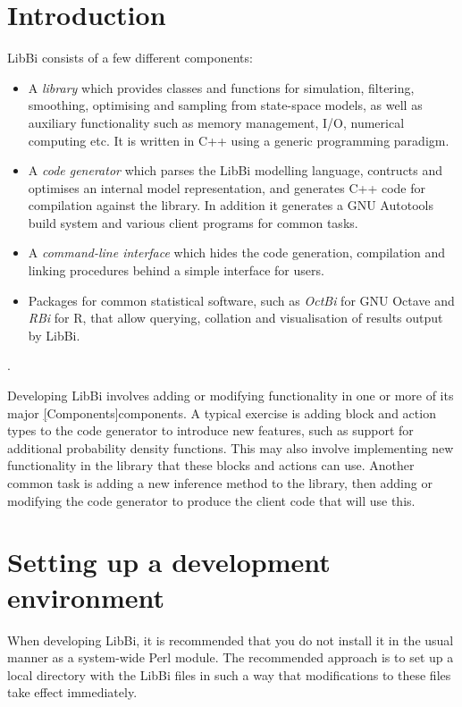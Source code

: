 \section{Introduction}

LibBi consists of a few different components:
\begin{itemize}
\item A \emph{library} which provides classes and functions for simulation,
  filtering, smoothing, optimising and sampling from state-space models, as
  well as auxiliary functionality such as memory management, I/O, numerical
  computing etc. It is written in C++ using a generic programming paradigm.
\item A \emph{code generator} which parses the LibBi modelling language,
  contructs and optimises an internal model representation, and generates C++
  code for compilation against the library. In addition it generates a GNU
  Autotools build system and various client programs for common tasks.
\item A \emph{command-line interface} which hides the code generation,
  compilation and linking procedures behind a simple interface for users.
\item Packages for common statistical software, such as \emph{OctBi} for GNU
  Octave and \emph{RBi} for R, that allow querying, collation and
  visualisation of results output by LibBi.
\end{itemize}.

Developing LibBi involves adding or modifying functionality in one or more of
its major \hyperref[hyper][Components]{components}. A typical exercise is
adding block and action types to the code generator to introduce new features,
such as support for additional probability density functions. This may also
involve implementing new functionality in the library that these blocks and
actions can use. Another common task is adding a new inference method to the
library, then adding or modifying the code generator to produce the client
code that will use this.

\section{Setting up a development environment}

When developing LibBi, it is recommended that you do not install it in the
usual manner as a system-wide Perl module. The recommended approach is to set
up a local directory with the LibBi files in such a way that modifications to
these files take effect immediately.

